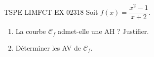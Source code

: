 \begin{exercice}{TSPE-LIMFCT-EX-023}{1}{8}
Soit $f(x) = \dfrac{x^2-1}{x+2}$.
\begin{enumerate}
  \item La courbe $\mathcal{C}_f$ admet-elle une AH ? Justifier.
  \item Déterminer les AV de $\mathcal{C}_f$.
\end{enumerate}
\end{exercice}
